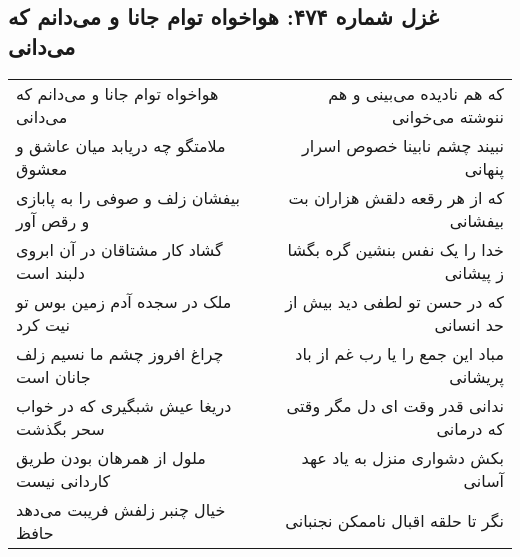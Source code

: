\begin{center}
\section*{غزل شماره ۴۷۴: هواخواه توام جانا و می‌دانم که می‌دانی}
\label{sec:sh474}
\begin{longtable}{l p{0.5cm} r}
هواخواه توام جانا و می‌دانم که می‌دانی
&&
که هم نادیده می‌بینی و هم ننوشته می‌خوانی
\\
ملامتگو چه دریابد میان عاشق و معشوق
&&
نبیند چشم نابینا خصوص اسرار پنهانی
\\
بیفشان زلف و صوفی را به پابازی و رقص آور
&&
که از هر رقعه دلقش هزاران بت بیفشانی
\\
گشاد کار مشتاقان در آن ابروی دلبند است
&&
خدا را یک نفس بنشین گره بگشا ز پیشانی
\\
ملک در سجده آدم زمین بوس تو نیت کرد
&&
که در حسن تو لطفی دید بیش از حد انسانی
\\
چراغ افروز چشم ما نسیم زلف جانان است
&&
مباد این جمع را یا رب غم از باد پریشانی
\\
دریغا عیش شبگیری که در خواب سحر بگذشت
&&
ندانی قدر وقت ای دل مگر وقتی که درمانی
\\
ملول از همرهان بودن طریق کاردانی نیست
&&
بکش دشواری منزل به یاد عهد آسانی
\\
خیال چنبر زلفش فریبت می‌دهد حافظ
&&
نگر تا حلقه اقبال ناممکن نجنبانی
\\
\end{longtable}
\end{center}
